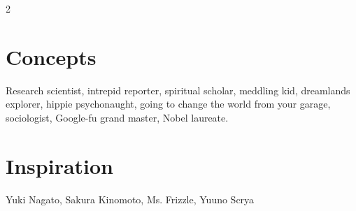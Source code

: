 \begin{multicols}{2}
\begin{itemize}
\end{itemize}

\section*{Concepts}
Research scientist, intrepid reporter, spiritual scholar, meddling kid, dreamlands explorer, hippie psychonaught, going to change the world from your garage, sociologist, Google-fu grand master, Nobel laureate.

\section*{Inspiration}
Yuki Nagato, Sakura Kinomoto, Ms. Frizzle, Yuuno Scrya 

\end{multicols}\newpage{}
